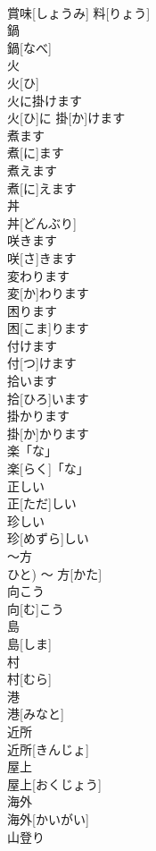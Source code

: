 \documentclass[8pt]{extreport}
\begin{document}
\begin{CJK}{UTF8}{min}
\\	賞味[しょうみ] 料[りょう]	
\\	鍋	
\\	鍋[なべ]	
\\	火	
\\	火[ひ]	
\\	火に掛けます	
\\	火[ひ]に 掛[か]けます	
\\	煮ます	
\\	煮[に]ます	
\\	煮えます	
\\	煮[に]えます	
\\	丼	
\\	丼[どんぶり]	
\\	咲きます	
\\	咲[さ]きます	
\\	変わります	
\\	変[か]わります	
\\	困ります	
\\	困[こま]ります	
\\	付けます	
\\	付[つ]けます	
\\	拾います	
\\	拾[ひろ]います	
\\	掛かります	
\\	掛[か]かります	
\\	楽「な」	
\\	楽[らく]「な」	
\\	正しい	
\\	正[ただ]しい	
\\	珍しい	
\\	珍[めずら]しい	
\\	〜方	
\\	ひと)	〜 方[かた]	
\\	向こう	
\\	向[む]こう	
\\	島	
\\	島[しま]	
\\	村	
\\	村[むら]	
\\	港	
\\	港[みなと]	
\\	近所	
\\	近所[きんじょ]	
\\	屋上	
\\	屋上[おくじょう]	
\\	海外	
\\	海外[かいがい]	
\\	山登り	

\end{CJK}
\end{document}
